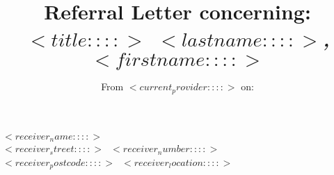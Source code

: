 \documentclass[11pt,english]{article}
\begin{document}

\title {Referral Letter concerning: \\ \emph {$<title::::>$ $<lastname::::>$, $<firstname::::>$}}
\author {From $<current_provider::::>$ on:}
\maketitle 



\paragraph* {
	$<receiver_name::::>$\\
	$<receiver_street::::>$\ $<receiver_number::::>$\\
	$<receiver_postcode::::>$\ $<receiver_location::::>$
}
\end{document}
